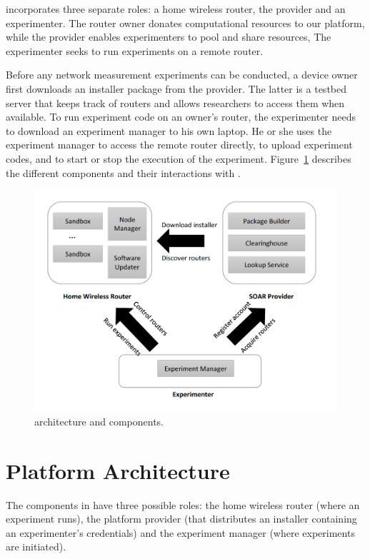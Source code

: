 \sysname incorporates three separate roles: a home wireless router, the \sysname provider and an experimenter. The router owner donates computational resources to our platform, while the \sysname provider enables experimenters to pool and share resources, The experimenter seeks to run experiments on a remote router.

Before any network measurement experiments can be conducted, a device owner first downloads an installer package from the \sysname provider. The latter is a testbed server that keeps track of routers and allows researchers to access them when available. To run experiment code on an owner's router, the experimenter needs to download an experiment manager to his own laptop. He or she uses the experiment manager to access the remote router directly, to upload experiment codes, and to start or stop the execution of the experiment. Figure~\ref{fig-arch} describes the different components and their interactions with \sysname.

\begin{figure}%
\centering
\includegraphics[width=0.8\columnwidth]{figure/soar-arch.png}
\caption{\sysname architecture and components.}
\label{fig-arch}
\end{figure}

\section{Platform Architecture}
The components in \sysname have three possible roles: the home wireless router (where an experiment runs), the platform provider (that distributes an installer containing an experimenter's credentials) and the experiment manager (where experiments are initiated).

